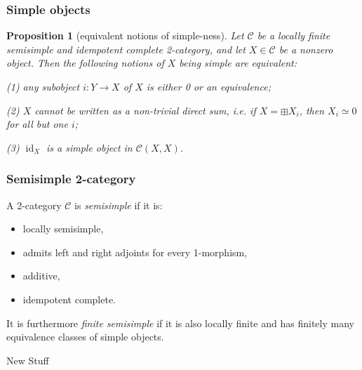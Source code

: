 \documentclass{beamer}
\DeclareMathOperator{\id}{id}
\newtheorem{proposition}[theorem]{Proposition}
\newcommand{\cC}{{\mathcal{C}}}
\begin{document}
\begin{frame}
\frametitle{Simple objects}

\begin{proposition}[equivalent notions of simple-ness]
Let $\cC$ be a locally finite semisimple and
idempotent complete 2-category,
and let $X \in \cC$ be a nonzero object.
Then the following notions of $X$ being simple are equivalent:

\pause

(1) any subobject $i: Y \to X$ of $X$
 is either 0 or an equivalence;

\pause

(2) $X$ cannot be written as a non-trivial direct sum,
	i.e. if $X = \boxplus X_i$,
	then $X_i \simeq 0$ for all but one $i$;

\pause

(3) $\id_X$ is a simple object in $\cC(X,X)$.
\end{proposition}

\end{frame}


\begin{frame}
\frametitle{Semisimple 2-category}

\begin{definition}
A 2-category $\cC$ is \emph{semisimple}
if it is:
\begin{itemize}
\item locally semisimple,
\item admits left and right adjoints for every 1-morphism,
\item additive,
\item idempotent complete.
\end{itemize}

It is furthermore \emph{finite semisimple}
if it is also locally finite and
has finitely many equivalence classes of simple objects.
\end{definition}

\end{frame}


\begin{frame}

\begin{center}
\Huge New Stuff
\end{center}

\end{frame}
\end{document}
